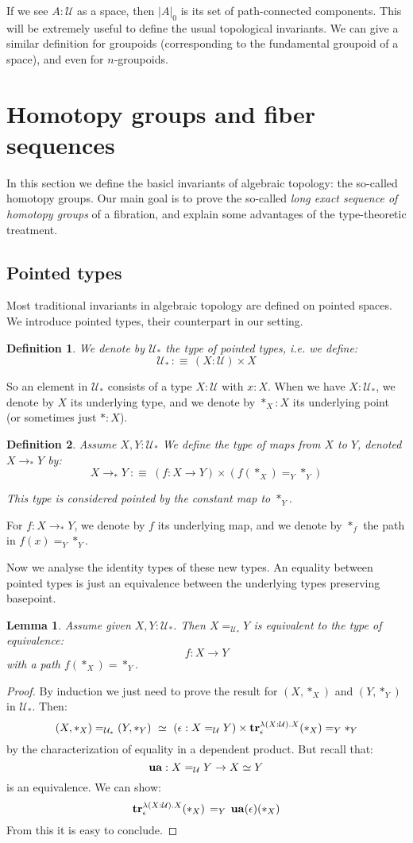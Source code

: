 \documentclass{article}
\newcommand{\se}[1]{\medbreak \medbreak \section{#1}}
\newcommand{\sse}[1]{\medbreak \subsection{#1}}
\newcommand{\U}{{\mathcal U}}
\renewcommand{\r}{\rightarrow}
\newcommand{\Gl}{\lambda}
\newcommand{\tr}{\mathrm{\bf tr}}
\newcommand{\ua}{\mathrm{\bf ua}}
\newcommand{\Map}{\mathrm{Map}}
\newtheorem{lemma}{Lemma}
\newtheorem{definition}{Definition}
\begin{document}
If we see $A:\U$ as a space, then $|A|_0$ is its set of path-connected components. This will be extremely useful to define the usual topological invariants. We can give a similar definition for groupoids (corresponding to the fundamental groupoid of a space), and even for $n$-groupoids.







\se{Homotopy groups and fiber sequences}

In this section we define the basicl invariants of algebraic topology: the so-called homotopy groups. Our main goal is to prove the so-called \emph{long exact sequence of homotopy groups} of a fibration, and explain some advantages of the type-theoretic treatment.%


\sse{Pointed types}

Most traditional invariants in algebraic topology are defined on pointed spaces. We introduce pointed types, their counterpart in our setting.

\begin{definition}
We denote by $\U_*$ the type of pointed types, i.e. we define:
\[\U_* \, :\equiv\, (X:\U)\times X\]
\end{definition}

So an element in $\U_*$ consists of a type $X:\U$ with $x:X$. When we have $X:\U_*$, we denote by $X$ its underlying type, and we denote by $*_X:X$ its underlying point (or sometimes just $*:X$).

\begin{definition}
Assume $X, Y:\U_*$ We define the type of maps from $X$ to $Y$, denoted $X\r_*Y$ by:
\[X\r_*Y \ :\equiv\ (f:X\r Y)\times (f(*_X) =_Y *_Y)\]

This type is considered pointed by the constant map to $*_Y$.
\end{definition}

For $f:X\r_*Y$, we denote by $f$ its underlying map, and we denote by $*_f$ the path in $f(x)=_Y*_Y$.


Now we analyse the identity types of these new types. An equality between pointed types is just an equivalence between the underlying types preserving basepoint.

\begin{lemma}
Assume given $X,Y:\U_*$. Then $X=_{\U_*} Y$ is equivalent to the type of equivalence:
\[f:X\r Y\]
 with a path $f(*_X)=*_Y$.
\end{lemma}
\begin{proof}
By induction we just need to prove the result for $(X,*_X)$ and $(Y,*_Y)$ in $\U_*$. Then:
\[(X,*_X) =_{\U_*}(Y,*_Y) \ \simeq \ (\epsilon : X=_\U Y)\times \tr_\epsilon^{\Gl(X:\U).X}(*_X) =_Y *_Y\]
by the characterization of equality in a dependent product. But recall that: 
\[\ua : X=_\U Y\r X\simeq Y\] 
is an equivalence. We can show:
\[\tr_\epsilon^{\Gl(X:\U).X}(*_X) \, =_Y \, \ua(\epsilon)(*_X)\]
From this it is easy to conclude.
\end{proof}
\end{document}
